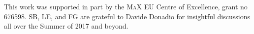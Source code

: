\begin{acknowledgement}
This work was supported in part by the \textsc{MaX} EU Centre of Excellence, grant no 676598. SB, LE, and FG are grateful to Davide Donadio for insightful discussions all over the Summer of 2017 and beyond.
\end{acknowledgement}





